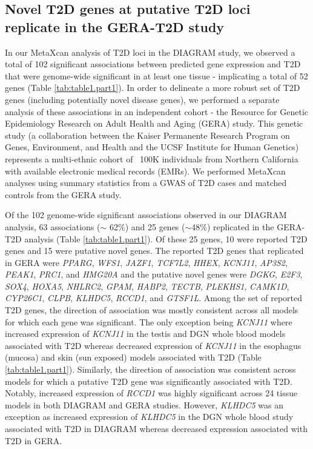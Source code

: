 \documentclass[10pt]{article}
\begin{document}
\subsection*{Novel T2D genes at putative T2D loci replicate in the GERA-T2D study}

In our MetaXcan analysis of T2D loci in the DIAGRAM study, we observed a total of 102 significant associations between predicted gene expression and T2D that were genome-wide significant in at least one tissue - implicating a total of 52 genes (Table \ref{tab:table1.part1}). In order to delineate a more robust set of T2D genes (including potentially novel disease genes), we performed a separate analysis of these associations in an independent cohort - the Resource for Genetic Epidemiology Research on Adult Health and Aging (GERA) study. This genetic study (a collaboration between the Kaiser Permanente Research Program on Genes, Environment, and Health and the UCSF Institute for Human Genetics) represents a multi-ethnic cohort of ~100K individuals from Northern California with available electronic medical records (EMRs). We performed MetaXcan analyses using summary statistics from a GWAS of T2D cases and matched controls from the GERA study.

Of the 102 genome-wide significant associations observed in our DIAGRAM analysis, 63 associations ($\sim$ 62\%) and 25 genes ($\sim$48\%) replicated in the GERA-T2D analysis (Table \ref{tab:table1.part1}). Of these 25 genes, 10 were reported T2D genes and 15 were putative novel genes. The reported T2D genes that replicated in GERA were \textit{PPARG}, \textit{WFS1}, \textit{JAZF1}, \textit{TCF7L2}, \textit{HHEX}, \textit{KCNJ11}, \textit{AP3S2}, \textit{PEAK1}, \textit{PRC1}, and \textit{HMG20A} and the putative novel genes were \textit{DGKG}, \textit{E2F3}, \textit{SOX4}, \textit{HOXA5}, \textit{NHLRC2}, \textit{GPAM}, \textit{HABP2}, \textit{TECTB}, \textit{PLEKHS1}, \textit{CAMK1D}, \textit{CYP26C1}, \textit{CLPB}, \textit{KLHDC5}, \textit{RCCD1}, and \textit{GTSF1L}. Among the set of reported T2D genes, the direction of association was mostly consistent across all models for which each gene was significant. The only exception being \textit{KCNJ11} where increased expression of \textit{KCNJ11} in the testis and DGN whole blood models associated with T2D whereas decreased expression of \textit{KCNJ11} in the esophagus (mucosa) and skin (sun exposed) models associated with T2D (Table \ref{tab:table1.part1}). Similarly, the direction of association was consistent across models for which a putative T2D gene was significantly associated with T2D. Notably, increased expression of \textit{RCCD1} was highly significant across 24 tissue models in both DIAGRAM and GERA studies. However, \textit{KLHDC5} was an exception as increased expression of \textit{KLHDC5} in the DGN whole blood study associated with T2D in DIAGRAM whereas decreased expression associated with T2D in GERA.
\end{document}
